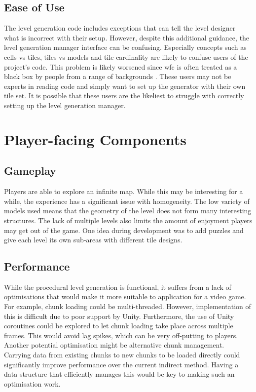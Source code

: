 \subsection{Ease of Use}
The level generation code includes exceptions that can tell the level designer what is incorrect with their setup. However, despite this additional guidance, the level generation manager interface can be confusing. Especially concepts such as cells vs tiles, tiles vs models and tile cardinality are likely to confuse users of the project's code. This problem is likely worsened since \acrshort{wfc} is often treated as a black box by people from a range of backgrounds \cite{WFC_In_The_Wild}. These users may not be experts in reading code and simply want to set up the generator with their own tile set. It is possible that these users are the likeliest to struggle with correctly setting up the level generation manager.

\section{Player-facing Components}
\subsection{Gameplay}
Players are able to explore an infinite map. While this may be interesting for a while, the experience has a significant issue with homogeneity. The low variety of models used means that the geometry of the level does not form many interesting structures. The lack of multiple levels also limits the amount of enjoyment players may get out of the game. One idea during development was to add puzzles and give each level its own sub-areas with different tile designs.

\subsection{Performance}
While the procedural level generation is functional, it suffers from a lack of optimisations that would make it more suitable to application for a video game. For example, chunk loading could be multi-threaded. However, implementation of this is difficult due to poor support by Unity. Furthermore, the use of Unity coroutines could be explored to let chunk loading take place across multiple frames. This would avoid lag spikes, which can be very off-putting to players. Another potential optimisation might be alternative chunk management. Carrying data from existing chunks to new chunks to be loaded directly could significantly improve performance over the current indirect method. Having a data structure that efficiently manages this would be key to making such an optimisation work.